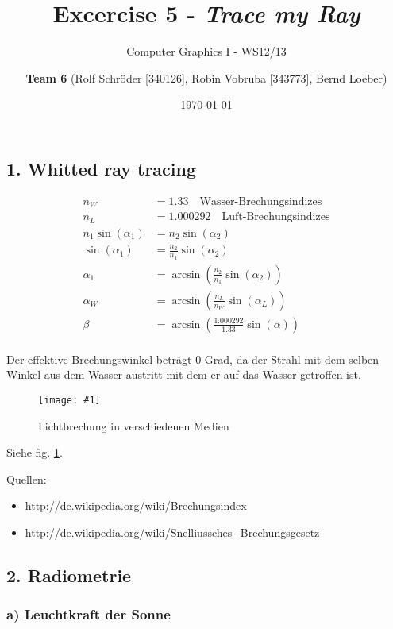 \documentclass[a4paper,headings=small]{scrartcl}
\title{Excercise 5 - \emph{Trace my Ray}}
\subtitle{Computer Graphics I - WS12/13}
\author{\textbf{Team 6} (Rolf Schröder [340126], Robin Vobruba [343773], Bernd Loeber)}
\date{\today}
\numberwithin{equation}{section} %
\numberwithin{figure}{section}   %
\newcommand{\image}[3]{
	\begin{figure}[htbp]
		\centering
		\texttt{[image: \#1]}
		\caption{#3}
		\label{fig:#1}
	\end{figure}
}
\begin{document}
\maketitle

\subsection*{1. Whitted ray tracing}


\begin{align*}
n_W &= 1.33 \quad \text{Wasser-Brechungsindizes} \\
n_L &= 1.000292 \quad \text{Luft-Brechungsindizes} \\
n_1 \sin(\alpha_1) &= n_2 \sin(\alpha_2) \\
\sin(\alpha_1) &= \frac{n_2}{n_1} \sin(\alpha_2) \\
\alpha_1 &= \arcsin(\frac{n_2}{n_1} \sin(\alpha_2)) \\
\alpha_W &= \arcsin(\frac{n_L}{n_W} \sin(\alpha_L)) \\
\beta &= \arcsin(\frac{1.000292}{1.33} \sin(\alpha)) \\
\end{align*}

Der effektive Brechungswinkel beträgt 0 Grad, da der Strahl mit dem selben Winkel aus dem Wasser austritt mit dem er auf das Wasser getroffen ist.

\image{img/brechungswinkel}{0.8}{Lichtbrechung in verschiedenen Medien}

Siehe fig. \ref{fig:img/brechungswinkel}.

Quellen:
\begin{itemize}
\item http://de.wikipedia.org/wiki/Brechungsindex
\item http://de.wikipedia.org/wiki/Snelliussches\_Brechungsgesetz
\end{itemize}


\subsection*{2. Radiometrie}

\subsubsection*{a) Leuchtkraft der Sonne}
\end{document}
